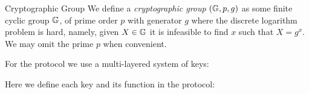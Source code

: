 \begin{definitiontoc}{Cryptographic Group}
    We define a \emph{cryptographic group} $({\mathbb{G}}, p, g)$ as some finite cyclic group ${\mathbb{G}}$, of prime order $p$ with generator $g$ where the discrete logarithm problem is hard, namely, given $X \in {\mathbb{G}}$ it is infeasible to find $x$ such that $X = g^x$. We may omit the prime $p$ when convenient.
\end{definitiontoc}


For the \Transfer{} protocol we use a multi-layered system of keys:

\begin{center}
    \vspace{1em}
    \begin{mdframed}[leftmargin=0.125\textwidth, rightmargin=0.125\textwidth]
        \begin{center}
        \end{center}
    \end{mdframed}
    \vspace{-1em}
\end{center}

Here we define each key and its function in the \Transfer{} protocol:


